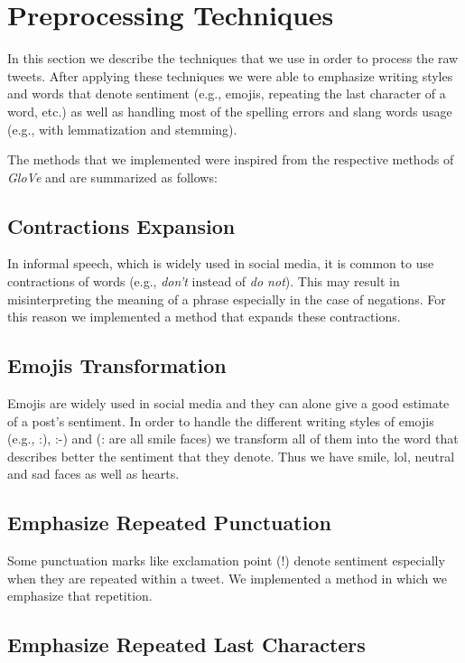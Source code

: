 \section{Preprocessing Techniques}
\label{sec:preprocessing}
In this section we describe the techniques that we use in order to process the raw tweets.
After applying these techniques we were able to emphasize writing styles and words that denote sentiment (e.g., emojis, repeating the last character of a word, etc.)
as well as handling most of the spelling errors and slang words usage (e.g., with lemmatization and stemming).

The methods that we implemented were inspired from the respective methods of \textit{GloVe} \cite{pennington2014glove} and are summarized as follows:

\subsection{Contractions Expansion}
In informal speech, which is widely used in social media, it is common to use contractions of words (e.g., \textit{don't} instead of \textit{do not}).
This may result in misinterpreting the meaning of a phrase especially in the case of negations.
For this reason we implemented a method that expands these contractions.

\subsection{Emojis Transformation}
Emojis are widely used in social media and they can alone give a good estimate of a post's sentiment.
In order to handle the different writing styles of emojis (e.g., :), :-) and (: are all smile faces) we transform all of them into the word that describes better the sentiment that they denote.
Thus we have smile, lol, neutral and sad faces as well as hearts.

\subsection{Emphasize Repeated Punctuation}

Some punctuation marks like exclamation point (!) denote sentiment especially when they are repeated within a tweet. 
We implemented a method in which we emphasize that repetition.

\subsection{Emphasize Repeated Last Characters}

